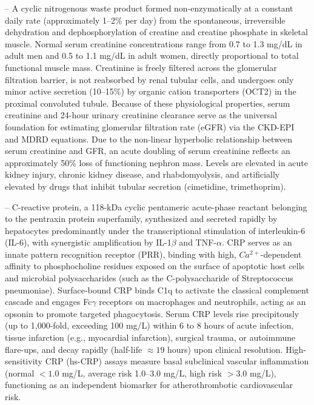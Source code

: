 -- A cyclic nitrogenous waste product formed non-enzymatically at a constant daily rate (approximately 1--2\% per day) from the spontaneous, irreversible dehydration and dephosphorylation of creatine and creatine phosphate in skeletal muscle. Normal serum creatinine concentrations range from 0.7 to 1.3 mg/dL in adult men and 0.5 to 1.1 mg/dL in adult women, directly proportional to total functional muscle mass. Creatinine is freely filtered across the glomerular filtration barrier, is not reabsorbed by renal tubular cells, and undergoes only minor active secretion (10--15\%) by organic cation transporters (OCT2) in the proximal convoluted tubule. Because of these physiological properties, serum creatinine and 24-hour urinary creatinine clearance serve as the universal foundation for estimating glomerular filtration rate (eGFR) via the CKD-EPI and MDRD equations. Due to the non-linear hyperbolic relationship between serum creatinine and GFR, an acute doubling of serum creatinine reflects an approximately 50\% loss of functioning nephron mass. Levels are elevated in acute kidney injury, chronic kidney disease, and rhabdomyolysis, and artificially elevated by drugs that inhibit tubular secretion (cimetidine, trimethoprim).

-- C-reactive protein, a 118-kDa cyclic pentameric acute-phase reactant belonging to the pentraxin protein superfamily, synthesized and secreted rapidly by hepatocytes predominantly under the transcriptional stimulation of interleukin-6 (IL-6), with synergistic amplification by IL-1$\beta$ and TNF-$\alpha$. CRP serves as an innate pattern recognition receptor (PRR), binding with high, $Ca^{2+}$-dependent affinity to phosphocholine residues exposed on the surface of apoptotic host cells and microbial polysaccharides (such as the C-polysaccharide of Streptococcus pneumoniae). Surface-bound CRP binds C1q to activate the classical complement cascade and engages Fc$\gamma$ receptors on macrophages and neutrophils, acting as an opsonin to promote targeted phagocytosis. Serum CRP levels rise precipitously (up to 1,000-fold, exceeding 100 mg/L) within 6 to 8 hours of acute infection, tissue infarction (e.g., myocardial infarction), surgical trauma, or autoimmune flare-ups, and decay rapidly (half-life $\approx 19$ hours) upon clinical resolution. High-sensitivity CRP (hs-CRP) assays measure basal subclinical vascular inflammation (normal $<1.0$ mg/L, average risk 1.0--3.0 mg/L, high risk $>3.0$ mg/L), functioning as an independent biomarker for atherothrombotic cardiovascular risk.

